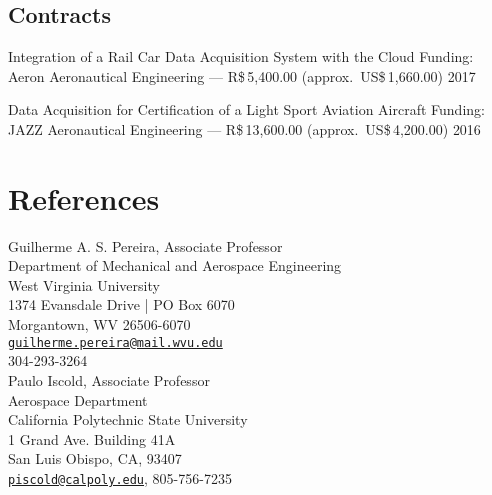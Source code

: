 \documentclass[letterpaper, 11pt, oneside]{memoir}
\begin{document}
\subsection{Contracts}
\begin{description} 
\item {Integration of a Rail Car Data Acquisition System with the Cloud}
{}{\newline Funding: Aeron Aeronautical Engineering ---
  R\$\,5,400.00 (approx.\ US\$\,1,660.00)}{}{}
 \hfill {2017}

\item 
{Data Acquisition for Certification of a Light Sport Aviation Aircraft}{}
{\newline Funding: JAZZ Aeronautical Engineering --- 
 R\$\,13,600.00 (approx.\ US\$\,4,200.00)}{}{}
\hfill {2016}
\end{description}

\section{References}
Guilherme A. S. Pereira, Associate Professor\\
Department of Mechanical and Aerospace Engineering\\
West Virginia University\\
1374 Evansdale Drive | PO Box 6070\\
Morgantown, WV 26506-6070 \\
\texttt{\href{mailto:guilherme.pereira@mail.wvu.edu}{guilherme.pereira@mail.wvu.edu}}\\
304-293-3264 
\\[1ex]

\noindent
Paulo Iscold, Associate Professor\\
Aerospace Department\\
California Polytechnic State University\\
1 Grand Ave. Building 41A\\
San Luis Obispo, CA, 93407\\
\texttt{\href{piscold@calpoly.edu}{piscold@calpoly.edu}}, 
805-756-7235
\\[1ex]
\end{document}
